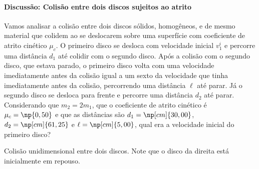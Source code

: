 \paragraph{Discussão: Colisão entre dois discos sujeitos ao atrito}

Vamos analisar a colisão entre dois discos sólidos, homogêneos, e de mesmo material que colidem ao se deslocarem sobre uma superfície com coeficiente de atrito cinético $\mu_c$. O primeiro disco se desloca com velocidade inicial $v_1^i$ e percorre uma distância $d_1$ até colidir com o segundo disco. Após a colisão com o segundo disco, que estava parado, o primeiro disco volta com uma velocidade imediatamente antes da colisão igual a um sexto da velocidade que tinha imediatamente antes da colisão, percorrendo uma distância $\ell$ até parar. Já o segundo disco se desloca para frente e percorre uma distância $d_2$ até parar. Considerando que $m_2 = 2 m_1$, que o coeficiente de atrito cinético é $\mu_c = \np{0,50}$ e que as distâncias são $d_1 = \np[cm]{30,00}$, $d_2 = \np[cm]{61,25}$ e $\ell = \np[cm]{5,00}$, qual era a velocidade inicial do primeiro disco?

\begin{marginfigure}
\centering
{}
\caption{Colisão unidimensional entre dois discos. Note que o disco da direita está inicialmente em repouso.}
\end{marginfigure}

